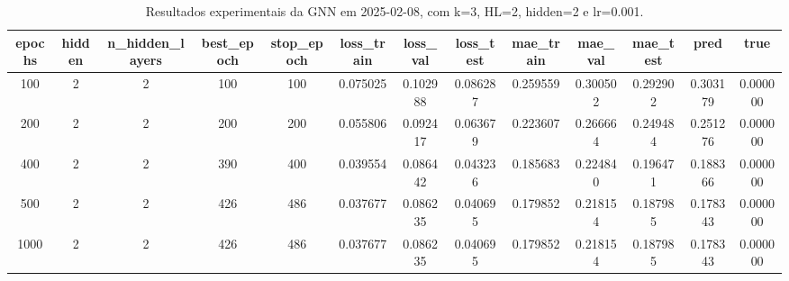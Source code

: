 \begin{table}[h]
\centering
\caption{Resultados experimentais da GNN em 2025-02-08, com k=3, HL=2, hidden=2 e lr=0.001.}
\label{tab:gnn_results_k3_hl2_h2_d20250208}
\begin{tabular}{ccccccccccccc}
\toprule
epochs & hidden & n\_hidden\_layers & best\_epoch & stop\_epoch & loss\_train & loss\_val & loss\_test & mae\_train & mae\_val & mae\_test & pred & true \\
\midrule
100 & 2 & 2 & 100 & 100 & 0.075025 & 0.102988 & 0.086287 & 0.259559 & 0.300502 & 0.292902 & 0.303179 & 0.000000 \\
200 & 2 & 2 & 200 & 200 & 0.055806 & 0.092417 & 0.063679 & 0.223607 & 0.266664 & 0.249484 & 0.251276 & 0.000000 \\
400 & 2 & 2 & 390 & 400 & 0.039554 & 0.086442 & 0.043236 & 0.185683 & 0.224840 & 0.196471 & 0.188366 & 0.000000 \\
500 & 2 & 2 & 426 & 486 & 0.037677 & 0.086235 & 0.040695 & 0.179852 & 0.218154 & 0.187985 & 0.178343 & 0.000000 \\
1000 & 2 & 2 & 426 & 486 & 0.037677 & 0.086235 & 0.040695 & 0.179852 & 0.218154 & 0.187985 & 0.178343 & 0.000000 \\
\bottomrule
\end{tabular}
\end{table}
